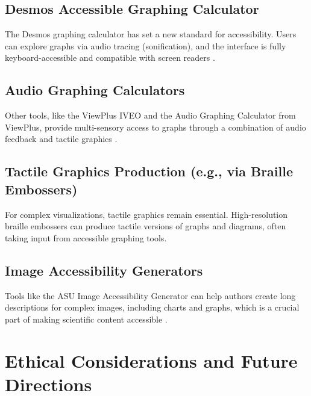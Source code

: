 \subsection{Desmos Accessible Graphing Calculator}\label{ch11:ssec:desmos}
The Desmos graphing calculator has set a new standard for accessibility. Users can explore graphs via audio tracing (sonification), and the interface is fully keyboard-accessible and compatible with screen readers \supercite{Desmos, DesmosAccessibility}.

\subsection{Audio Graphing Calculators}\label{ch11:ssec:audio-graphing}
Other tools, like the ViewPlus IVEO and the Audio Graphing Calculator from ViewPlus, provide multi-sensory access to graphs through a combination of audio feedback and tactile graphics \supercite{ViewPlusAGC, OrionTI84}.

\subsection{Tactile Graphics Production (e.g., via Braille Embossers)}\label{ch11:ssec:tactile-graphics}
For complex visualizations, tactile graphics remain essential. High-resolution braille embossers can produce tactile versions of graphs and diagrams, often taking input from accessible graphing tools.

\subsection{Image Accessibility Generators}\label{ch11:ssec:image-generators}
Tools like the ASU Image Accessibility Generator can help authors create long descriptions for complex images, including charts and graphs, which is a crucial part of making scientific content accessible \supercite{ASUImageAccessibilityGenerator}.

\section{Ethical Considerations and Future Directions}\label{ch11:sec:ethics}
